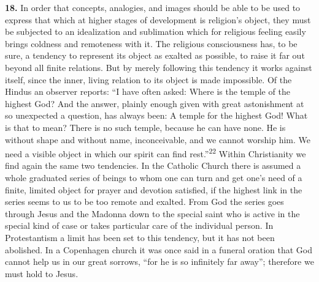 \documentclass[12pt,a4paper]{book}
\begin{document}
\noindent\textbf{18.} In order that concepts, analogies, and images should be
able to be used to express that which at higher stages of development is
religion's object, they must be subjected to an idealization and sublimation
which for religious feeling easily brings coldness and remoteness with it. The
religious consciousness has, to be sure, a tendency to represent its object as
exalted as possible, to raise it far out beyond all finite relations. But by
merely following this tendency it works against itself, since the inner, living
relation to its object is made impossible. Of the Hindus an observer reports:
``I have often asked: Where is the temple of the highest God? And the answer,
plainly enough given with great astonishment at so unexpected a question, has
always been: A temple for the highest God! What is that to mean? There is no
such temple, because he can have none. He is without shape and without name,
inconceivable, and we cannot worship him. We need a visible object in which our
spirit can find rest.''\textsuperscript{22} Within Christianity we find again
the same two tendencies. In the Catholic Church there is assumed a whole
graduated series of beings to whom one can turn and get one's need of a finite,
limited object for prayer and devotion satisfied, if the highest link in the
series seems to us to be too remote and exalted. From God the series goes
through Jesus and the Madonna down to the special saint who is active in the
special kind of case or takes particular care of the individual person. In
Protestantism a limit has been set to this tendency, but it has not been
abolished. In a Copenhagen church it was once said in a funeral oration that
God cannot help us in our great sorrows, ``for he is so infinitely far away'';
therefore we must hold to Jesus.
\end{document}

